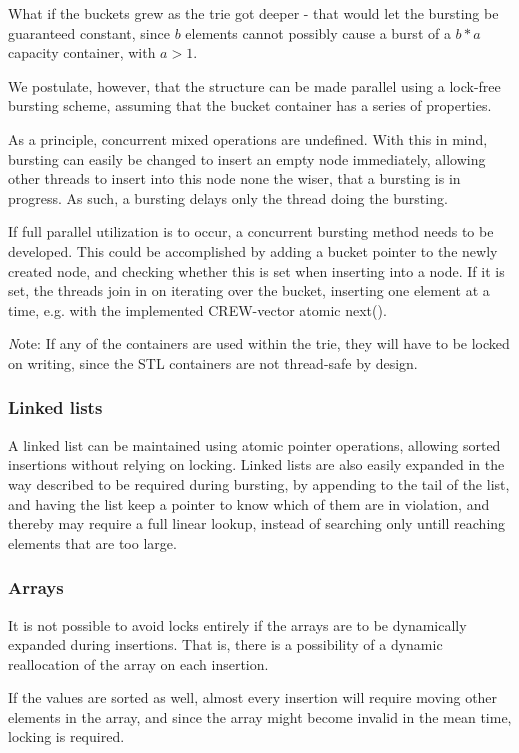 What if the buckets grew as the trie got deeper - that would let the bursting be
guaranteed constant, since $b$ elements cannot possibly cause a burst of a
$b*a$ capacity container, with $a > 1$.



We postulate, however, that the structure can be made parallel using a lock-free
bursting scheme, assuming that the bucket container has a series of properties.

As a principle, concurrent mixed operations are undefined.
With this in mind, bursting can easily be changed to insert an empty node
immediately, allowing other threads to insert into this node none the wiser,
that a bursting is in progress. As such, a bursting delays only the
thread doing the bursting.


If full parallel utilization is to occur, a concurrent bursting method
needs to be developed. This could be accomplished by adding a bucket pointer
to the newly created node, and checking whether this is set when inserting into a node.
If it is set, the threads join in on iterating over the bucket, inserting one
element at a time, e.g. with the implemented CREW-vector atomic next().

{\emph Note:} If any  of the \STL containers are used within the trie, they will
have to be locked on writing, since the STL containers are not thread-safe by
design.

\subsubsection{Linked lists}
A linked list can be maintained using atomic pointer operations, allowing
sorted insertions without relying on locking.
Linked lists are also easily expanded in the way described to be required during
bursting, by appending to the tail of the list, and having the list keep a
pointer to know which of them are in violation, and thereby may require a
full linear lookup, instead of searching only untill reaching elements that are
too large.

\subsubsection{Arrays}
It is not possible to avoid locks entirely if the arrays are to be dynamically
expanded during insertions. That is, there is a possibility of a dynamic
reallocation of the array on each insertion.

If the values are sorted as well, almost every insertion will require moving
other elements in the array, and since the array might become invalid in the
mean time, locking is required.

